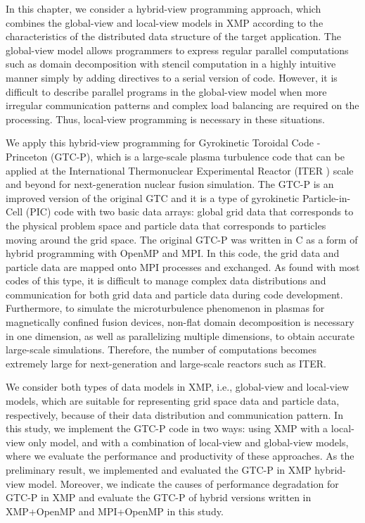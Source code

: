 In this chapter, we consider a hybrid-view programming approach, which combines the global-view and local-view models in XMP according to the characteristics of the distributed data structure of the target application.
The global-view model allows programmers to express regular parallel computations such as domain decomposition with stencil computation in a highly intuitive manner simply by adding directives to a serial version of code. However, it is difficult to describe parallel programs in the global-view model when more irregular communication patterns and complex load balancing are required on the processing. Thus, local-view programming is necessary in these situations.

We apply this hybrid-view programming for Gyrokinetic Toroidal Code - Princeton (GTC-P)\cite{GTC-P1}, which is a large-scale plasma turbulence code that can be applied at the International Thermonuclear Experimental Reactor (ITER \cite{ITER}) scale and beyond for next-generation nuclear fusion simulation. The GTC-P is an improved version of the original GTC\cite{GTC} and it is a type of gyrokinetic Particle-in-Cell (PIC) code with two basic data arrays: global grid data that corresponds to the physical problem space and particle data that corresponds to particles moving around the grid space. The original GTC-P was written in C as a form of hybrid programming with OpenMP and MPI. In this code, the grid data and particle data are mapped onto MPI processes and exchanged. As found with most codes of this type, it is difficult to manage complex data distributions and communication for both grid data and particle data during code development. Furthermore, to simulate the microturbulence phenomenon in plasmas for magnetically confined fusion devices, non-flat domain decomposition is necessary in one dimension, as well as parallelizing multiple dimensions, to obtain accurate large-scale simulations. Therefore, the number of computations becomes extremely large for next-generation and large-scale reactors such as ITER.

We consider both types of data models in XMP, i.e., global-view and local-view models, which are suitable for representing grid space data and particle data, respectively, because of their data distribution and communication pattern. In this study, we implement the GTC-P code in two ways: using XMP with a local-view only model, and with a combination of local-view and global-view models, where we evaluate the performance and productivity of these approaches. As the preliminary result, we implemented and evaluated the GTC-P in XMP hybrid-view model\cite{HYBRID}. Moreover, we indicate the causes of performance degradation for GTC-P in XMP and evaluate the GTC-P of hybrid versions written in XMP+OpenMP and MPI+OpenMP in this study.

